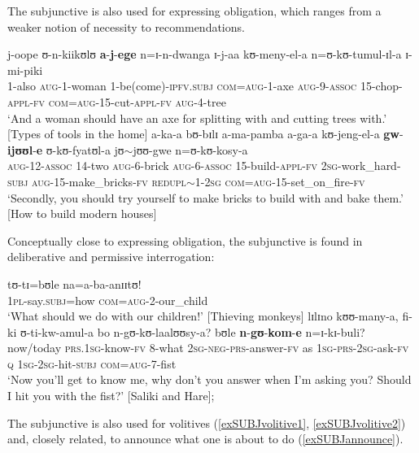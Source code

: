The subjunctive is also used for expressing obligation, which ranges from a weaker notion of necessity to recommendations.
\begin{exe}
\ex \gll j-oope ʊ-n-kiikʊlʊ \textbf{a}-\textbf{j}-\textbf{ege} n=ɪ-n-dwanga ɪ-j-aa kʊ-meny-el-a n=ʊ-kʊ-tumul-ɪl-a ɪ-mi-piki\\
1-also \textsc{aug}-1-woman 1-be(come)-\textsc{ipfv.subj} \textsc{com}=\textsc{aug}-1-axe \textsc{aug}-9-\textsc{assoc} 15-chop-\textsc{appl}-\textsc{fv} \textsc{com}=\textsc{aug}-15-cut-\textsc{appl}-\textsc{fv} \textsc{aug}-4-tree\\
\glt \lq And a woman should have an axe for splitting with and cutting trees with.' [Types of tools in the home]
\ex \gll a-ka-a bʊ-bɪlɪ a-ma-pamba a-ga-a kʊ-jeng-el-a \textbf{gw}-\textbf{ijʊʊl}-\textbf{e} ʊ-kʊ-fyatʊl-a jʊ$\sim$jʊʊ-gwe n=ʊ-kʊ-kosy-a\\
\textsc{aug}-12-\textsc{assoc} \textsc{14}-two \textsc{aug}-6-brick \textsc{aug}-6-\textsc{assoc} 15-build-\textsc{appl}-\textsc{fv} \textsc{2sg}-work\_hard-\textsc{subj} \textsc{aug}-15-make\_bricks-\textsc{fv} \textsc{redupl}$\sim$1-\textsc{2sg} \textsc{com}=\textsc{aug}-15-set\_on\_fire-\textsc{fv}\\
\glt \lq ‎‎Secondly, you should try yourself to make bricks to build with and bake them.' [How to build modern houses]
\end{exe}

Conceptually close to expressing obligation, the subjunctive is found in deliberative and permissive interrogation:
\begin{exe}
\ex \gll tʊ-tɪ=bʊle na=a-ba-anɪɪtʊ!\\
\textsc{1pl}-say.\textsc{subj}=how \textsc{com}=\textsc{aug}-2-our\_child\\
\glt `‎‎What should we do with our children!' [Thieving monkeys]
\ex \gll lɪlɪno kʊʊ-many-a, fi-ki ʊ-ti-kw-amul-a bo n-gʊ-kʊ-laalʊʊsy-a? bʊle \textbf{n}-\textbf{gʊ}-\textbf{kom}-\textbf{e} n=ɪ-kɪ-buli?\\
now/today \textsc{prs}.\textsc{1sg}-know-\textsc{fv} 8-what \textsc{2sg}-\textsc{neg}-\textsc{prs}-answer-\textsc{fv} as \textsc{1sg}-\textsc{prs}-\textsc{2sg}-ask-\textsc{fv} \textsc{q} \textsc{1sg}-\textsc{2sg}-hit-\textsc{subj} \textsc{com}=\textsc{aug}-7-fist\\
\glt `Now you'll get to know me, why don't you answer when I'm asking you? Should I hit you with the fist?' [Saliki and Hare];
\end{exe}

The subjunctive is also used for volitives (\ref{exSUBJvolitive1}, \ref{exSUBJvolitive2}) and, closely related, to announce what one is about to do (\ref{exSUBJannounce}).


